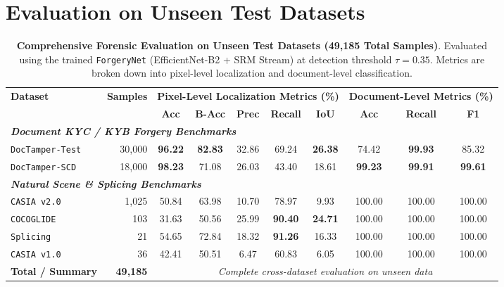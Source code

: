 \documentclass[10pt,a4paper]{article}
\begin{document}
\section*{Evaluation on Unseen Test Datasets}

\begin{table}[htbp]
\centering
\small
\caption{\textbf{Comprehensive Forensic Evaluation on Unseen Test Datasets (49,185 Total Samples)}. Evaluated using the trained \texttt{ForgeryNet} (EfficientNet-B2 + SRM Stream) at detection threshold $\tau = 0.35$. Metrics are broken down into pixel-level localization and document-level classification.}
\label{tab:unseen_dataset_performance}
\vspace{2mm}
\begin{tabular*}{\textwidth}{@{\extracolsep{\fill}} l r ccccc ccc @{}}
\toprule
\multirow{2}{*}{\textbf{Dataset}} & \multirow{2}{*}{\textbf{Samples}} & \multicolumn{5}{c}{\textbf{Pixel-Level Localization Metrics (\%)}} & \multicolumn{3}{c}{\textbf{Document-Level Metrics (\%)}} \\
\cmidrule(lr){3-7} \cmidrule(lr){8-10}
& & \textbf{Acc} & \textbf{B-Acc} & \textbf{Prec} & \textbf{Recall} & \textbf{IoU} & \textbf{Acc} & \textbf{Recall} & \textbf{F1} \\
\midrule
\multicolumn{10}{l}{\textit{\textbf{Document KYC / KYB Forgery Benchmarks}}} \\
\quad \texttt{DocTamper-Test} & 30,000 & \textbf{96.22} & \textbf{82.83} & 32.86 & 69.24 & \textbf{26.38} & 74.42 & \textbf{99.93} & 85.32 \\
\quad \texttt{DocTamper-SCD}  & 18,000 & \textbf{98.23} & 71.08 & 26.03 & 43.40 & 18.61 & \textbf{99.23} & \textbf{99.91} & \textbf{99.61} \\
\midrule
\multicolumn{10}{l}{\textit{\textbf{Natural Scene \& Splicing Benchmarks}}} \\
\quad \texttt{CASIA v2.0}     & 1,025  & 50.84 & 63.98 & 10.70 & 78.97 & 9.93  & 100.00 & 100.00 & 100.00 \\
\quad \texttt{COCOGLIDE}      & 103    & 31.63 & 50.56 & 25.99 & \textbf{90.40} & \textbf{24.71} & 100.00 & 100.00 & 100.00 \\
\quad \texttt{Splicing}       & 21     & 54.65 & 72.84 & 18.32 & \textbf{91.26} & 16.33 & 100.00 & 100.00 & 100.00 \\
\quad \texttt{CASIA v1.0}     & 36     & 42.41 & 50.51 & 6.47  & 60.83 & 6.05  & 100.00 & 100.00 & 100.00 \\
\midrule
\textbf{Total / Summary}      & \textbf{49,185} & \multicolumn{8}{c}{\textit{Complete cross-dataset evaluation on unseen data}} \\
\bottomrule
\end{tabular*}
\end{table}
\end{document}
